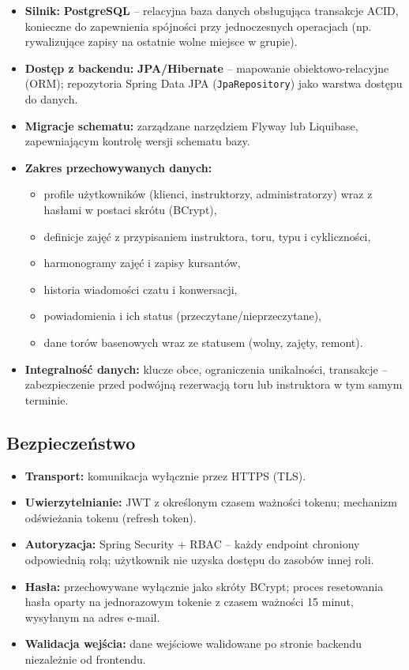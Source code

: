 \documentclass[a4paper,12pt]{article}
\begin{document}
\begin{itemize}
    \item \textbf{Silnik:} \textbf{PostgreSQL} -- relacyjna baza danych obsługująca transakcje ACID, konieczne do zapewnienia spójności przy jednoczesnych operacjach (np. rywalizujące zapisy na ostatnie wolne miejsce w grupie).
    \item \textbf{Dostęp z backendu:} \textbf{JPA/Hibernate} -- mapowanie obiektowo-relacyjne (ORM); repozytoria Spring Data JPA (\texttt{JpaRepository}) jako warstwa dostępu do danych.
    \item \textbf{Migracje schematu:} zarządzane narzędziem Flyway lub Liquibase, zapewniającym kontrolę wersji schematu bazy.
    \item \textbf{Zakres przechowywanych danych:}
    \begin{itemize}
        \item profile użytkowników (klienci, instruktorzy, administratorzy) wraz z hasłami w postaci skrótu (BCrypt),
        \item definicje zajęć z przypisaniem instruktora, toru, typu i cykliczności,
        \item harmonogramy zajęć i zapisy kursantów,
        \item historia wiadomości czatu i konwersacji,
        \item powiadomienia i ich status (przeczytane/nieprzeczytane),
        \item dane torów basenowych wraz ze statusem (wolny, zajęty, remont).
    \end{itemize}
    \item \textbf{Integralność danych:} klucze obce, ograniczenia unikalności, transakcje -- zabezpieczenie przed podwójną rezerwacją toru lub instruktora w tym samym terminie.
\end{itemize}
 
\subsection{Bezpieczeństwo}
 
\begin{itemize}
    \item \textbf{Transport:} komunikacja wyłącznie przez HTTPS (TLS).
    \item \textbf{Uwierzytelnianie:} JWT z określonym czasem ważności tokenu; mechanizm odświeżania tokenu (refresh token).
    \item \textbf{Autoryzacja:} Spring Security + RBAC -- każdy endpoint chroniony odpowiednią rolą; użytkownik nie uzyska dostępu do zasobów innej roli.
    \item \textbf{Hasła:} przechowywane wyłącznie jako skróty BCrypt; proces resetowania hasła oparty na jednorazowym tokenie z czasem ważności 15 minut, wysyłanym na adres e-mail.
    \item \textbf{Walidacja wejścia:} dane wejściowe walidowane po stronie backendu niezależnie od frontendu.
\end{itemize}
 
\end{document}
